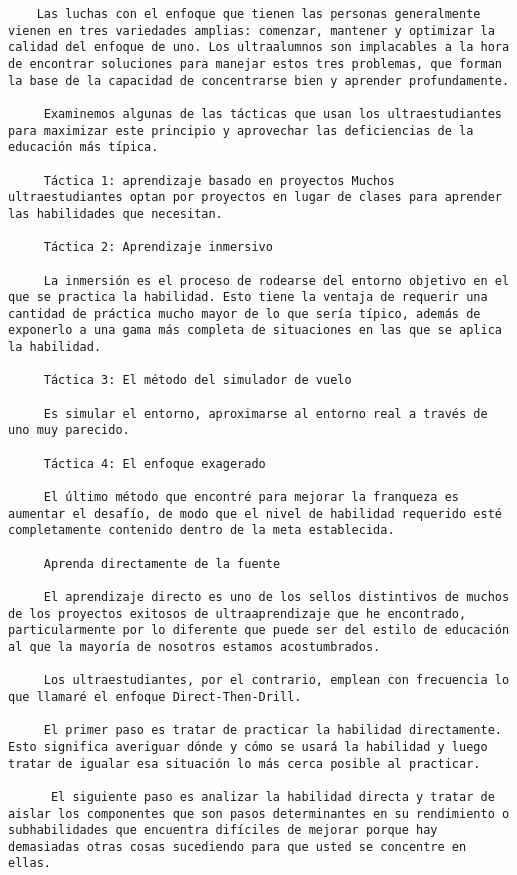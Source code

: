\begin{verbatim}
	Las luchas con el enfoque que tienen las personas generalmente vienen en tres variedades amplias: comenzar, mantener y optimizar la calidad del enfoque de uno. Los ultraalumnos son implacables a la hora de encontrar soluciones para manejar estos tres problemas, que forman la base de la capacidad de concentrarse bien y aprender profundamente.
	
	 Examinemos algunas de las tácticas que usan los ultraestudiantes para maximizar este principio y aprovechar las deficiencias de la educación más típica. 
	 
	 Táctica 1: aprendizaje basado en proyectos Muchos ultraestudiantes optan por proyectos en lugar de clases para aprender las habilidades que necesitan.
	 
	 Táctica 2: Aprendizaje inmersivo
	 
	 La inmersión es el proceso de rodearse del entorno objetivo en el que se practica la habilidad. Esto tiene la ventaja de requerir una cantidad de práctica mucho mayor de lo que sería típico, además de exponerlo a una gama más completa de situaciones en las que se aplica la habilidad.
	 
	 Táctica 3: El método del simulador de vuelo
	 
	 Es simular el entorno, aproximarse al entorno real a través de uno muy parecido.
	 
	 Táctica 4: El enfoque exagerado
	 
	 El último método que encontré para mejorar la franqueza es aumentar el desafío, de modo que el nivel de habilidad requerido esté completamente contenido dentro de la meta establecida. 
	 
	 Aprenda directamente de la fuente
	 
	 El aprendizaje directo es uno de los sellos distintivos de muchos de los proyectos exitosos de ultraaprendizaje que he encontrado, particularmente por lo diferente que puede ser del estilo de educación al que la mayoría de nosotros estamos acostumbrados.
	 
	 Los ultraestudiantes, por el contrario, emplean con frecuencia lo que llamaré el enfoque Direct-Then-Drill.
	 
	 El primer paso es tratar de practicar la habilidad directamente. Esto significa averiguar dónde y cómo se usará la habilidad y luego tratar de igualar esa situación lo más cerca posible al practicar. 
	 
	  El siguiente paso es analizar la habilidad directa y tratar de aislar los componentes que son pasos determinantes en su rendimiento o subhabilidades que encuentra difíciles de mejorar porque hay demasiadas otras cosas sucediendo para que usted se concentre en ellas.
	  

\end{verbatim}

